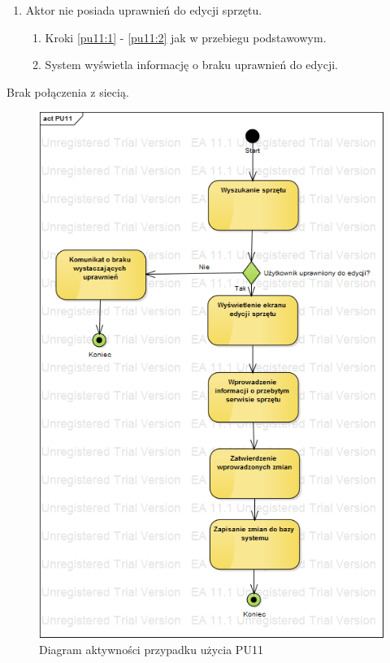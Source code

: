 \begin{enumerate}
	\item Aktor nie posiada uprawnień do edycji sprzętu.
	\begin{enumerate}[label*=\arabic*.]
		\item Kroki \ref{pu11:1} - \ref{pu11:2} jak w przebiegu podstawowym.
		\item System wyświetla informację o braku uprawnień do edycji.
	\end{enumerate}
\end{enumerate}


Brak połączenia z siecią.

\begin{figure}[h!]
	\centering
	\includegraphics[scale=0.6]{img/diagrams/activityDiagrams/PU11.png}
	\caption{Diagram aktywności przypadku użycia PU11 \label{fig:labelADPU11}}
\end{figure}